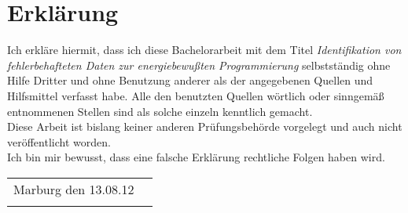{} %
\chapter*{Erkl\"arung}


\normalsize
Ich erkl\"are hiermit, dass ich diese Bachelorarbeit mit dem Titel \textit{Identifikation von fehlerbehafteten Daten zur energiebewu\ss ten Programmierung} selbstst\"andig ohne Hilfe Dritter und ohne Benutzung anderer als der angegebenen Quellen und Hilfsmittel verfasst habe. Alle den benutzten Quellen w\"ortlich oder sinngem\"a\ss {} entnommenen Stellen sind als solche einzeln kenntlich gemacht.\\

\noindent Diese Arbeit ist bislang keiner anderen Pr\"ufungsbeh\"orde vorgelegt und auch nicht ver\"offentlicht worden.\\

\noindent Ich bin mir bewusst, dass eine falsche Erkl\"arung rechtliche Folgen haben wird.\\[3cm]

 
\vspace{5em}
 
\begin{flushright}
\begin{table}[ht]
\begin{tabularx}{\textwidth}{Xp{7cm}}
Marburg den 13.08.12 & \tabularnewline \cline{2-2}  \addlinespace
 & \centering{Ren\'{e} Frank}
\end{tabularx}
\end{table}
\end{flushright}
